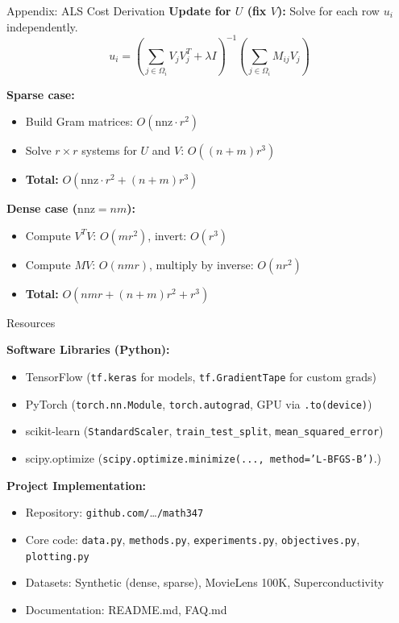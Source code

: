 \documentclass[aspectratio=169,usenames,dvipsnames]{beamer}
\begin{document}
\begin{frame}{Appendix: ALS Cost Derivation}
    \textbf{Update for $U$ (fix $V$):} Solve for each row $u_i$ independently.
    \[
    u_i = \left( \sum_{j \in \Omega_i} V_j V_j^T + \lambda I \right)^{-1} \left( \sum_{j \in \Omega_i} M_{ij} V_j \right)
    \]

    \textbf{Sparse case:}
\begin{itemize}
    \item Build Gram matrices: $O(\text{nnz} \cdot r^2)$
    \item Solve $r \times r$ systems for $U$ and $V$: $O((n+m) r^3)$
    \item \textbf{Total:} $O(\text{nnz} \cdot r^2 + (n+m) r^3)$
\end{itemize}

\vspace{0.15cm}
\textbf{Dense case ($\text{nnz} = nm$):}
\begin{itemize}
    \item Compute $V^TV$: $O(m r^2)$, invert: $O(r^3)$
    \item Compute $MV$: $O(n m r)$, multiply by inverse: $O(n r^2)$
    \item \textbf{Total:} $O(n m r + (n+m) r^2 + r^3)$
\end{itemize}
\end{frame}




\begin{frame}{Resources}
    
    \textbf{Software Libraries (Python):}
    \begin{itemize}
        \item TensorFlow (\texttt{tf.keras} for models, \texttt{tf.GradientTape} for custom grads)
        \item PyTorch (\texttt{torch.nn.Module}, \texttt{torch.autograd}, GPU via \texttt{.to(device)})
        \item scikit-learn (\texttt{StandardScaler}, \texttt{train\_test\_split}, \texttt{mean\_squared\_error})
        \item scipy.optimize (\texttt{scipy.optimize.minimize(..., method='L-BFGS-B')}.)
    \end{itemize}

    \vspace{0.3cm}
    
    \textbf{Project Implementation:}
    \begin{itemize}
        \item Repository: \texttt{github.com/}\ldots\texttt{/math347}
        \item Core code: \texttt{data.py}, \texttt{methods.py}, \texttt{experiments.py}, \texttt{objectives.py}, \texttt{plotting.py}
        \item Datasets: Synthetic (dense, sparse), MovieLens 100K, Superconductivity
        \item Documentation: README.md, FAQ.md 
    \end{itemize}
\end{frame}
\end{document}
